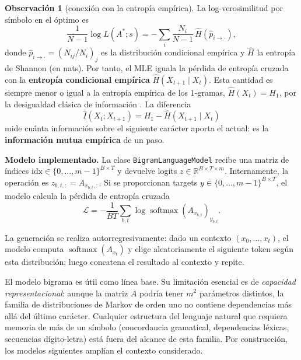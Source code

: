 \documentclass[11pt]{report}
\newenvironment{tcolorbox}[1][]{\par\medskip\noindent\ignorespaces}{\par\medskip}
\theoremstyle{definition}
\newtheorem{observacion}[definicion]{Observación}
\theoremstyle{plain}
\numberwithin{equation}{section}
\newcommand{\R}{\mathbb{R}}
\newcommand{\softmax}{\operatorname{softmax}}
\begin{document}
\begin{observacion}[conexión con la entropía empírica]
La log-verosimilitud por símbolo en el óptimo es
\begin{equation*}
    \frac{1}{N-1}\log L(A^*;s)
    =
    -\sum_{i}\frac{N_i}{N-1}\,
    \widehat H(\widehat p_{i\to\cdot}),
\end{equation*}
donde \(\widehat p_{i\to\cdot}=(N_{ij}/N_i)_{j}\) es la distribución condicional empírica y \(\widehat H\) la entropía de Shannon (en nats). Por tanto, el MLE iguala la pérdida de entropía cruzada con la \textbf{entropía condicional empírica} \(\widehat H(X_{t+1}\mid X_t)\). Esta cantidad es siempre menor o igual a la entropía empírica de los \(1\)-gramas, \(\widehat H(X_t)=H_1\), por la desigualdad clásica de información \citep[Cap.~2]{durrett-2019}. La diferencia
\begin{equation*}
    \widehat I(X_t;X_{t+1}) = H_1 - \widehat H(X_{t+1}\mid X_t)
\end{equation*}
mide cuánta información sobre el siguiente carácter aporta el actual: es la \textbf{información mutua empírica} de un paso.
\end{observacion}

\begin{tcolorbox}[colback=blue!8, colframe=blue!8, boxrule=0pt]
\textbf{Modelo implementado.} La clase \texttt{BigramLanguageModel} recibe una matriz de índices \(\mathrm{idx}\in\{0,\ldots,m-1\}^{B\times T}\) y devuelve logits \(z\in\R^{B\times T\times m}\). Internamente, la operación es \(z_{b,t,:}=A_{x_{b,t},:}\). Si se proporcionan targets \(y\in\{0,\ldots,m-1\}^{B\times T}\), el modelo calcula la pérdida de entropía cruzada
\begin{equation*}
    \mathcal{L}
    =
    -\frac{1}{BT}\sum_{b,t}\log\softmax(A_{x_{b,t}})_{y_{b,t}}.
\end{equation*}
\end{tcolorbox}

La generación se realiza autorregresivamente: dado un contexto \((x_0,\ldots,x_t)\), el modelo computa \(\softmax(A_{x_t})\) y elige aleatoriamente el siguiente token según esta distribución; luego concatena el resultado al contexto y repite.

El modelo bigrama es útil como línea base. Su limitación esencial es de \emph{capacidad representacional}: aunque la matriz \(A\) podría tener \(m^2\) parámetros distintos, la familia de distribuciones de Markov de orden uno no contiene dependencias más allá del último carácter. Cualquier estructura del lenguaje natural que requiera memoria de más de un símbolo (concordancia gramatical, dependencias léxicas, secuencias dígito-letra) está fuera del alcance de esta familia. Por construcción, los modelos siguientes amplían el contexto considerado.
\end{document}
